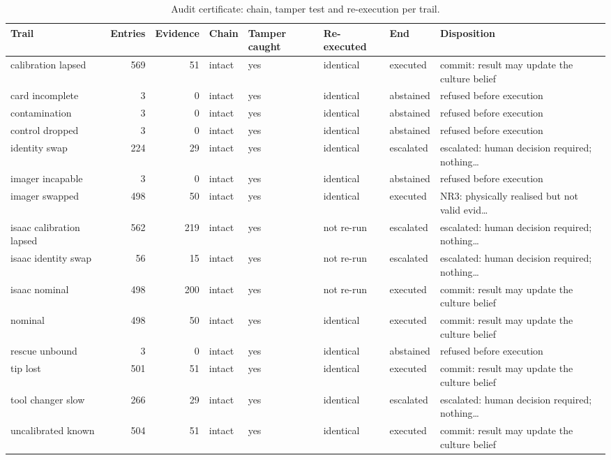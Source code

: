 \documentclass[10pt,a4paper]{article}
\begin{document}
\begin{table}[tbp]\centering\footnotesize
\caption{Audit certificate: chain, tamper test and re-execution per trail.}\label{tab:audit_cert}
\begin{tabularx}{\linewidth}{Xrrllllp{3.2cm}}\toprule
\textbf{Trail} & \textbf{Entries} & \textbf{Evidence} & \textbf{Chain} & \textbf{Tamper caught} & \textbf{Re-executed} & \textbf{End} & \textbf{Disposition} \\\midrule
calibration lapsed & 569 & 51 & intact & yes & identical & executed & commit: result may update the culture belief \\
card incomplete & 3 & 0 & intact & yes & identical & abstained & refused before execution \\
contamination & 3 & 0 & intact & yes & identical & abstained & refused before execution \\
control dropped & 3 & 0 & intact & yes & identical & abstained & refused before execution \\
identity swap & 224 & 29 & intact & yes & identical & escalated & escalated: human decision required; nothing… \\
imager incapable & 3 & 0 & intact & yes & identical & abstained & refused before execution \\
imager swapped & 498 & 50 & intact & yes & identical & executed & NR3: physically realised but not valid evid… \\
isaac calibration lapsed & 562 & 219 & intact & yes & not re-run & escalated & escalated: human decision required; nothing… \\
isaac identity swap & 56 & 15 & intact & yes & not re-run & escalated & escalated: human decision required; nothing… \\
isaac nominal & 498 & 200 & intact & yes & not re-run & executed & commit: result may update the culture belief \\
nominal & 498 & 50 & intact & yes & identical & executed & commit: result may update the culture belief \\
rescue unbound & 3 & 0 & intact & yes & identical & abstained & refused before execution \\
tip lost & 501 & 51 & intact & yes & identical & executed & commit: result may update the culture belief \\
tool changer slow & 266 & 29 & intact & yes & identical & escalated & escalated: human decision required; nothing… \\
uncalibrated known & 504 & 51 & intact & yes & identical & executed & commit: result may update the culture belief \\\bottomrule
\end{tabularx}
\end{table}
\end{document}
